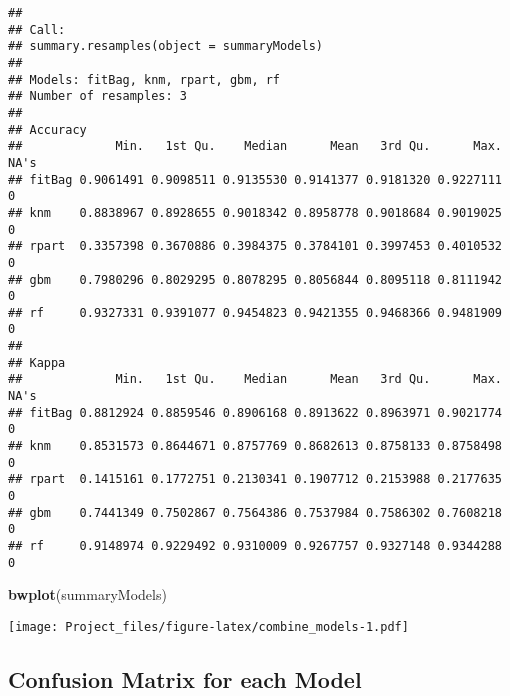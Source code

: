 \documentclass[]{article}
\newenvironment{Shaded}{\begin{snugshade}}{\end{snugshade}}
\newcommand{\KeywordTok}[1]{\textcolor[rgb]{0.13,0.29,0.53}{\textbf{#1}}}
\newcommand{\NormalTok}[1]{#1}
\begin{document}
\begin{verbatim}
## 
## Call:
## summary.resamples(object = summaryModels)
## 
## Models: fitBag, knm, rpart, gbm, rf 
## Number of resamples: 3 
## 
## Accuracy 
##             Min.   1st Qu.    Median      Mean   3rd Qu.      Max. NA's
## fitBag 0.9061491 0.9098511 0.9135530 0.9141377 0.9181320 0.9227111    0
## knm    0.8838967 0.8928655 0.9018342 0.8958778 0.9018684 0.9019025    0
## rpart  0.3357398 0.3670886 0.3984375 0.3784101 0.3997453 0.4010532    0
## gbm    0.7980296 0.8029295 0.8078295 0.8056844 0.8095118 0.8111942    0
## rf     0.9327331 0.9391077 0.9454823 0.9421355 0.9468366 0.9481909    0
## 
## Kappa 
##             Min.   1st Qu.    Median      Mean   3rd Qu.      Max. NA's
## fitBag 0.8812924 0.8859546 0.8906168 0.8913622 0.8963971 0.9021774    0
## knm    0.8531573 0.8644671 0.8757769 0.8682613 0.8758133 0.8758498    0
## rpart  0.1415161 0.1772751 0.2130341 0.1907712 0.2153988 0.2177635    0
## gbm    0.7441349 0.7502867 0.7564386 0.7537984 0.7586302 0.7608218    0
## rf     0.9148974 0.9229492 0.9310009 0.9267757 0.9327148 0.9344288    0
\end{verbatim}

\begin{Shaded}
\begin{Highlighting}[]
\KeywordTok{bwplot}\NormalTok{(summaryModels)}
\end{Highlighting}
\end{Shaded}

\texttt{[image: Project\_files/figure-latex/combine\_models-1.pdf]}

\subsection{Confusion Matrix for each
Model}\label{confusion-matrix-for-each-model}
\end{document}

